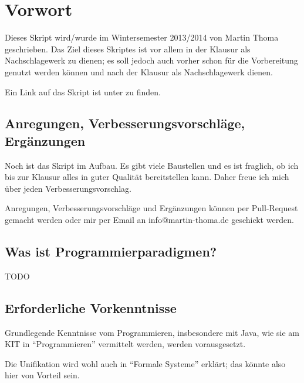 \chapter*{Vorwort}
Dieses Skript wird/wurde im Wintersemester 2013/2014
von Martin Thoma geschrieben. Das Ziel dieses Skriptes ist vor allem
in der Klausur als Nachschlagewerk zu dienen; es soll jedoch auch
vorher schon für die Vorbereitung genutzt werden können und nach
der Klausur als Nachschlagewerk dienen.

Ein Link auf das Skript ist unter \href{http://martin-thoma.com/programmierparadigmen-klausur/}{}
zu finden.

\section*{Anregungen, Verbesserungsvorschläge, Ergänzungen}
Noch ist das Skript im Aufbau. Es gibt viele Baustellen und es ist
fraglich, ob ich bis zur Klausur alles in guter Qualität bereitstellen
kann. Daher freue ich mich über jeden Verbesserungsvorschlag.

Anregungen, Verbesserungsvorschläge und Ergänzungen können per
Pull-Request gemacht werden oder mir per Email an info@martin-thoma.de
geschickt werden.

\section*{Was ist Programmierparadigmen?}

TODO

\section*{Erforderliche Vorkenntnisse}
Grundlegende Kenntnisse vom Programmieren, insbesondere mit Java,
wie sie am KIT in \enquote{Programmieren} vermittelt werden, werden
vorausgesetzt.

Die Unifikation wird wohl auch in \enquote{Formale Systeme}
erklärt; das könnte also hier von Vorteil sein.

